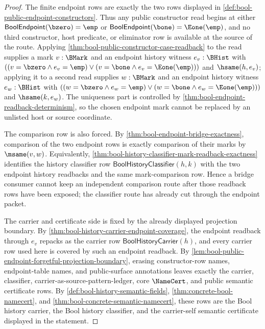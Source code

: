 \begin{proof}
The finite endpoint rows are exactly the two rows displayed in \autoref{def:bool-public-endpoint-constructors}. Thus any public constructor read begins at either
$\mathsf{BoolEndpoint}(\bzero)=\emp$ or
$\mathsf{BoolEndpoint}(\bone)=\Eone(\emp)$, and no third constructor, host predicate, or eliminator row is available at the source of the route. Applying \autoref{thm:bool-public-constructor-case-readback} to the read supplies a mark $v:\BMark$ and an endpoint history witness $e_v:\BHist$ with
$((v=\bzero \land e_v=\emp) \lor (v=\bone \land e_v=\Eone(\emp)))$ and $\hsame(h,e_v)$; applying it to a second read supplies $w:\BMark$ and an endpoint history witness $e_w:\BHist$ with
$((w=\bzero \land e_w=\emp) \lor (w=\bone \land e_w=\Eone(\emp)))$ and $\hsame(k,e_w)$. The uniqueness part is controlled by \autoref{thm:bool-endpoint-readback-determinism}, so the chosen endpoint mark cannot be replaced by an unlisted host or source coordinate.

The comparison row is also forced. By \autoref{thm:bool-endpoint-bridge-exactness}, comparison of the two endpoint rows is exactly comparison of their marks by $\msame(v,w)$. Equivalently, \autoref{thm:bool-history-classifier-mark-readback-exactness} identifies the history classifier row $\mathsf{BoolHistoryClassifier}(h,k)$ with the two endpoint history readbacks and the same mark-comparison row. Hence a bridge consumer cannot keep an independent comparison route after those readback rows have been exposed; the classifier route has already cut through the endpoint packet.

The carrier and certificate side is fixed by the already displayed projection boundary. By \autoref{thm:bool-history-carrier-endpoint-coverage}, the endpoint readback through $e_v$ repacks as the carrier row $\mathsf{BoolHistoryCarrier}(h)$, and every carrier row used here is covered by such an endpoint readback. By \autoref{lem:bool-public-endpoint-forgetful-projection-boundary}, erasing constructor-row names, endpoint-table names, and public-surface annotations leaves exactly the carrier, classifier, carrier-as-source-pattern-ledger, core $\NameCert$, and public semantic certificate rows. By \autoref{def:bool-history-semantic-fields}, \autoref{thm:concrete-bool-namecert}, and \autoref{thm:bool-concrete-semantic-namecert}, these rows are the Bool history carrier, the Bool history classifier, and the carrier-self semantic certificate displayed in the statement.


\end{proof}
